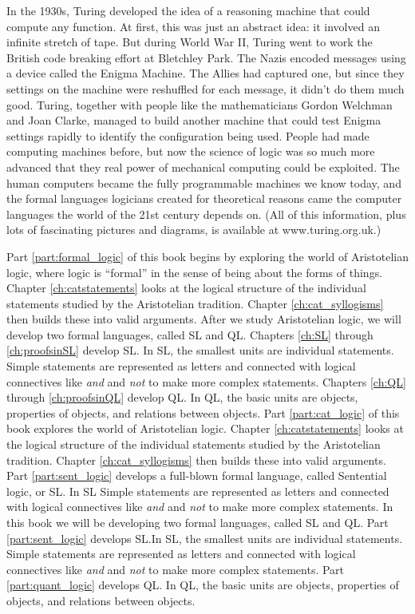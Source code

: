 In the 1930s, Turing developed the idea of a reasoning machine that could compute any function. At first, this was just an abstract idea: it involved an infinite stretch of tape. But during World War II, Turing went to work the British code breaking effort at Bletchley Park. The Nazis encoded messages using a device called the Enigma Machine. The Allies had captured one, but since they settings on the machine were reshuffled for each message, it didn't do them much good. Turing, together with people like the mathematicians Gordon Welchman and Joan Clarke, managed to build another machine that could test Enigma settings rapidly to identify the configuration being used. People had made computing machines before, but now the science of logic was so much more advanced that they real power of mechanical computing could be exploited. The human computers became the fully programmable machines we know today, and the formal languages logicians created for theoretical reasons came the computer languages the world of the 21st century depends on. (All of this information, plus lots of fascinating pictures and diagrams, is available at www.turing.org.uk.)

Part \ref{part:formal_logic} of this book begins by exploring the world of Aristotelian logic, where logic is ``formal'' in the sense of being about the forms of things. Chapter \ref{ch:catstatements} looks at the logical structure of the individual statements studied by the Aristotelian tradition. Chapter \ref{ch:cat_syllogisms} then builds these into valid arguments. After we study Aristotelian logic, we will develop two formal languages, called SL and QL.  Chapters \ref{ch:SL} through \ref{ch:proofsinSL} develop SL. In SL, the smallest units are individual statements.
Simple statements are represented as letters and connected with {logical connectives} like \emph{and} and \emph{not} to make more complex statements. Chapters \ref{ch:QL} through \ref{ch:proofsinQL} develop QL. In QL, the basic units are objects, properties of objects, and relations between objects.
Part \ref{part:cat_logic} of this book explores the world of Aristotelian logic. Chapter \ref{ch:catstatements} looks at the logical structure of the individual statements studied by the Aristotelian tradition. Chapter \ref{ch:cat_syllogisms} then builds these into valid arguments. Part \ref{part:sent_logic} develops a full-blown formal language, called Sentential logic, or SL. In SL Simple statements are represented as letters and connected with logical connectives like \emph{and} and \emph{not} to make more complex statements.
In this book we will be developing two formal languages, called SL and QL. Part \ref{part:sent_logic} develops SL.In SL, the smallest units are individual statements. Simple statements are represented as letters and connected with logical connectives like \emph{and} and \emph{not} to make more complex statements. Part \ref{part:quant_logic} develops QL. In QL, the basic units are objects, properties of objects, and relations between objects.




